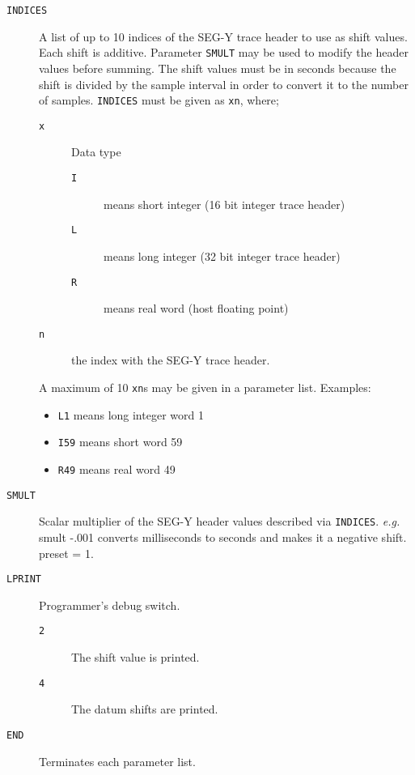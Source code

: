 \begin{description}
\item[\texttt{INDICES}] A list of up to 10 indices of the SEG-Y trace header to use
          as shift values.  Each shift is additive.  Parameter \texttt{SMULT}
          may be used to modify the header values before summing.  The
          shift values must be in seconds because the shift is divided
          by the sample interval in order to convert it to the number
          of samples.
          \texttt{INDICES} must be given as \texttt{xn}, where;
\begin{description}
\item[\texttt{x}] Data type
\begin{description}
\item[\texttt{I}] means short integer (16 bit integer trace header)
\item[\texttt{L}] means long integer (32 bit integer trace header)
\item[\texttt{R}] means real word (host floating point)
\end{description}
\item[\texttt{n}] the index with the SEG-Y trace header.
\end{description}
          A maximum of 10 \texttt{xn}s may be given in a parameter list.
          Examples:
          \begin{itemize}
              \item \texttt{L1} means long integer word 1
              \item \texttt{I59} means short word 59
              \item \texttt{R49}  means real word 49
          \end{itemize}

\item[\texttt{SMULT}] Scalar multiplier of the SEG-Y header values described via
         \texttt{INDICES}.  \textit{e.g.} smult -.001 converts milliseconds to seconds
         and makes it a negative shift.
         \Gls{preset} = 1.

\item[\texttt{LPRINT}] Programmer's debug switch.
\begin{description}
\item[\texttt{2}] The shift value is printed.
\item[\texttt{4}] The datum shifts are printed.
\end{description}

\item[\texttt{END}] Terminates each parameter list.
\end{description}

